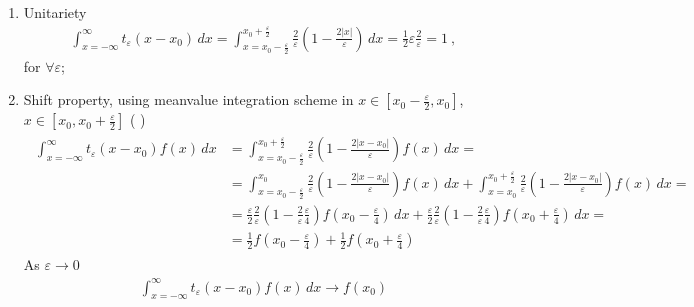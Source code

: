\documentclass[letterpaper,10pt,english]{jupyterBook}
\begin{document}
\begin{enumerate}
%
\item {} 
\sphinxAtStartPar
Unitariety
\begin{equation*}
\begin{split}\int_{x=-\infty}^{\infty} t_{\varepsilon}(x-x_0) \, dx = \int_{x=x_0-\frac{\varepsilon}{2}}^{x_0+\frac{\varepsilon}{2}} \frac{2}{\varepsilon} \left( 1 - \frac{2 |x|}{\varepsilon} \right) \, dx = \frac{1}{2} \varepsilon \frac{2}{\varepsilon} = 1 \ ,  \end{split}
\end{equation*}
\sphinxAtStartPar
for \(\forall \varepsilon\);

\item {} 
\sphinxAtStartPar
Shift property, using mean\sphinxhyphen{}value integration scheme in \(x \in \left[x_0-\frac{\varepsilon}{2}, x_0 \right]\),  \(x \in \left[x_0, x_0+\frac{\varepsilon}{2} \right]\) ( )
\begin{equation*}
\begin{split}\begin{aligned}
   \int_{x=-\infty}^{\infty} t_{\varepsilon}(x-x_0) f(x) \, dx
   & = \int_{x=x_0-\frac{\varepsilon}{2}}^{x_0+\frac{\varepsilon}{2}} \frac{2}{\varepsilon} \left( 1 - \frac{2 |x-x_0|}{\varepsilon} \right)  f(x) \, dx = \\
   & = \int_{x=x_0-\frac{\varepsilon}{2}}^{x_0} \frac{2}{\varepsilon} \left( 1 - \frac{2 |x-x_0|}{\varepsilon} \right)  f(x) \, dx 
     + \int_{x=x_0}^{x_0+\frac{\varepsilon}{2}} \frac{2}{\varepsilon} \left( 1 - \frac{2 |x-x_0|}{\varepsilon} \right)  f(x) \, dx = \\
   & = \frac{\varepsilon}{2} \frac{2}{\varepsilon} \left( 1 - \frac{2}{\varepsilon}\frac{\varepsilon}{4} \right)  f\left(x_0-\frac{\varepsilon}{4} \right) \, dx 
     + \frac{\varepsilon}{2} \frac{2}{\varepsilon} \left( 1 - \frac{2}{\varepsilon}\frac{\varepsilon}{4} \right)  f\left(x_0+\frac{\varepsilon}{4} \right) \, dx = \\
   & = \frac{1}{2} f\left( x_0 - \frac{\varepsilon}{4} \right) + \frac{1}{2} f\left( x_0 + \frac{\varepsilon}{4} \right)
   \end{aligned}\end{split}
\end{equation*}
\sphinxAtStartPar
As \(\varepsilon \rightarrow 0\)
\begin{equation*}
\begin{split}\int_{x=-\infty}^{\infty} t_{\varepsilon}(x-x_0) f(x) \, dx \rightarrow f(x_0) \end{split}
\end{equation*}
\end{enumerate}
\end{document}
